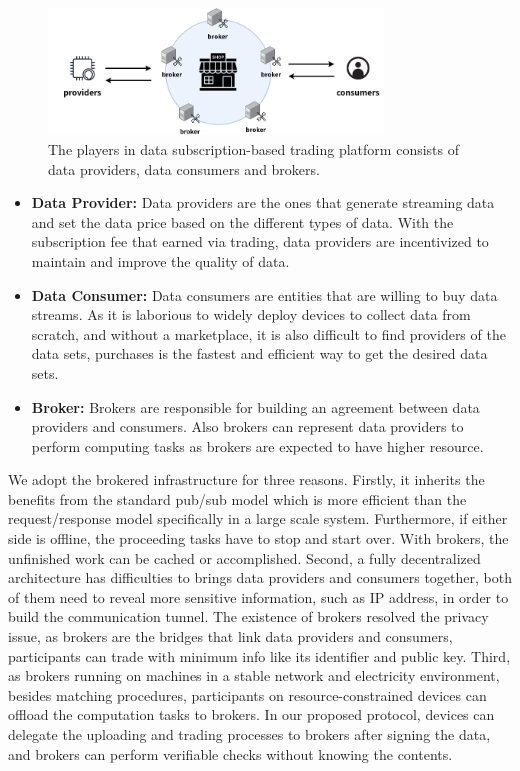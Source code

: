\documentclass[conference]{IEEEtran}
\begin{document}
\begin{figure}[!t]
    \centering
    \includegraphics[width=3.5in]{pub_sub_model}
    \caption{The players in data subscription-based trading platform consists of data providers, data consumers and brokers.}
    \label{fig:pub_sub_model}
\end{figure}

\begin{itemize}
\item \textbf{Data Provider: }
Data providers are the ones that generate streaming data and set the data price based on the different types of data. With the subscription fee that earned via trading, data providers are incentivized to maintain and improve the quality of data.
\item \textbf{Data Consumer: }
Data consumers are entities that are willing to buy data streams. As it is laborious to widely deploy devices to collect data from scratch, and without a marketplace, it is also difficult to find providers of the data sets, purchases is the fastest and efficient way to get the desired data sets.
\item \textbf{Broker: }
Brokers are responsible for building an agreement between data providers and consumers. Also brokers can represent data providers to perform computing tasks as brokers are expected to have higher resource.
\end{itemize}

We adopt the brokered infrastructure for three reasons. Firstly, it inherits the benefits from the standard pub/sub model which is more efficient than the request/response model specifically in a large scale system. Furthermore, if either side is offline, the proceeding tasks have to stop and start over. With brokers, the unfinished work can be cached or accomplished. Second, a fully decentralized architecture has difficulties to brings data providers and consumers together, both of them need to reveal more sensitive information, such as IP address, in order to build the communication tunnel. The existence of brokers resolved the privacy issue, as brokers are the bridges that link data providers and consumers, participants can trade with minimum info like its identifier and public key. Third, as brokers running on machines in a stable network and electricity environment, besides matching procedures, participants on resource-constrained devices can offload the computation tasks to brokers. In our proposed protocol, devices can delegate the uploading and trading processes to brokers after signing the data, and brokers can perform verifiable checks without knowing the contents.
\end{document}
